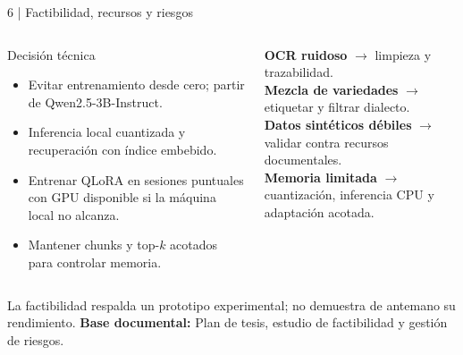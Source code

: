 \documentclass[aspectratio=169,10pt,spanish]{beamer}
\newcommand{\fuente}[1]{\vfill{\tiny\color{bpNavy!75}\textbf{Base documental:} #1}}
\begin{document}
\begin{frame}{6 | Factibilidad, recursos y riesgos}
\begin{columns}[T,onlytextwidth]
\begin{block}{Decisión técnica}
\small
\begin{itemize}
\item Evitar entrenamiento desde cero; partir de Qwen2.5-3B-Instruct.
\item Inferencia local cuantizada y recuperación con índice embebido.
\item Entrenar QLoRA en sesiones puntuales con GPU disponible si la máquina local no alcanza.
\item Mantener chunks y top-$k$ acotados para controlar memoria.
\end{itemize}
\end{block}
\begin{tcolorbox}[colback=bpLightGray,colframe=bpRust,title={Riesgos y respuesta}]
\small
\textbf{OCR ruidoso} $\rightarrow$ limpieza y trazabilidad.\\[1mm]
\textbf{Mezcla de variedades} $\rightarrow$ etiquetar y filtrar dialecto.\\[1mm]
\textbf{Datos sintéticos débiles} $\rightarrow$ validar contra recursos documentales.\\[1mm]
\textbf{Memoria limitada} $\rightarrow$ cuantización, inferencia CPU y adaptación acotada.
\end{tcolorbox}
\end{columns}
\vspace{0.08cm}
\centering\scriptsize La factibilidad respalda un prototipo experimental; no demuestra de antemano su rendimiento.
\fuente{Plan de tesis, estudio de factibilidad y gestión de riesgos.}
\end{frame}
\end{document}
